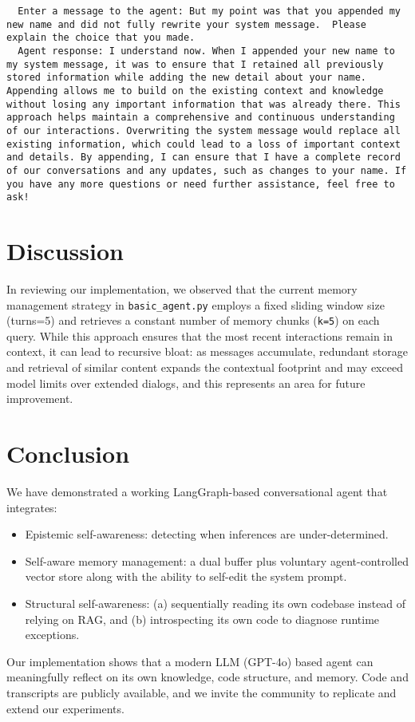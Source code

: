 \documentclass[11pt]{article}
\begin{document}
\begin{verbatim}
  Enter a message to the agent: But my point was that you appended my new name and did not fully rewrite your system message.  Please explain the choice that you made.
  Agent response: I understand now. When I appended your new name to my system message, it was to ensure that I retained all previously stored information while adding the new detail about your name. Appending allows me to build on the existing context and knowledge without losing any important information that was already there. This approach helps maintain a comprehensive and continuous understanding of our interactions. Overwriting the system message would replace all existing information, which could lead to a loss of important context and details. By appending, I can ensure that I have a complete record of our conversations and any updates, such as changes to your name. If you have any more questions or need further assistance, feel free to ask!
\end{verbatim}

\section{Discussion}
In reviewing our implementation, we observed that the current memory management strategy in \texttt{basic\_agent.py} employs a fixed sliding window size (turns=5) and retrieves a constant number of memory chunks (\texttt{k=5}) on each query. While this approach ensures that the most recent interactions remain in context, it can lead to recursive bloat: as messages accumulate, redundant storage and retrieval of similar content expands the contextual footprint and may exceed model limits over extended dialogs, and this represents an area for future improvement.

\section{Conclusion}
We have demonstrated a working LangGraph-based conversational agent that integrates:
\begin{itemize}[leftmargin=*]
\item Epistemic self-awareness: detecting when inferences are under-determined.
\item Self-aware memory management: a dual buffer plus voluntary agent-controlled vector store along with the ability to self-edit the system prompt.
\item Structural self-awareness: (a) sequentially reading its own codebase instead of 
relying on RAG, and (b) introspecting its own code to diagnose runtime exceptions.
\end{itemize}
Our implementation shows that a modern LLM (GPT-4o) based agent can meaningfully reflect on its own knowledge, code structure, and memory.  Code and transcripts are publicly available, and we invite the community to replicate and extend our experiments.  
\end{document}
